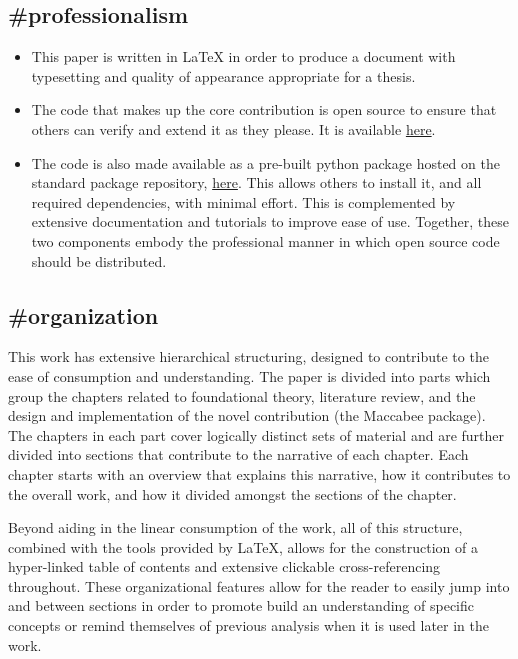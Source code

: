 \documentclass[./main.tex]{subfiles}
\begin{document}
\subsection*{\textbf{\#professionalism}}
\label{hc:professionalism}

\begin{itemize}
    \item This paper is written in \LaTeX \(  \) in order to produce a document with typesetting and quality of appearance appropriate for a thesis.
    
    \item The code that makes up the core contribution is open source to ensure that others can verify and extend it as they please. It is available \href{https://github.com/JoshBroomberg/Maccabee}{here}.
    
    \item The code is also made available as a pre-built python package hosted on the standard package repository, \href{https://pypi.org/project/maccabee/}{here}. This allows others to install it, and all required dependencies, with minimal effort. This is complemented by extensive documentation and tutorials to improve ease of use. Together, these two components embody the professional manner in which open source code should be distributed.
\end{itemize}


\subsection*{\textbf{\#organization}}
\label{hc:organization}

This work has extensive hierarchical structuring, designed to contribute to the ease of consumption and understanding. The paper is divided into parts which group the chapters related to foundational theory, literature review, and the design and implementation of the novel contribution (the Maccabee package). The chapters in each part cover logically distinct sets of material and are further divided into sections that contribute to the narrative of each chapter. Each chapter starts with an overview that explains this narrative, how it contributes to the overall work, and how it divided amongst the sections of the chapter.

\vspace{\baselineskip}

Beyond aiding in the linear consumption of the work, all of this structure, combined with the tools provided by \LaTeX, allows for the construction of a hyper-linked table of contents and extensive clickable cross-referencing throughout. These organizational features allow for the reader to easily jump into and between sections in order to promote build an understanding of specific concepts or remind themselves of previous analysis when it is used later in the work.
\end{document}
